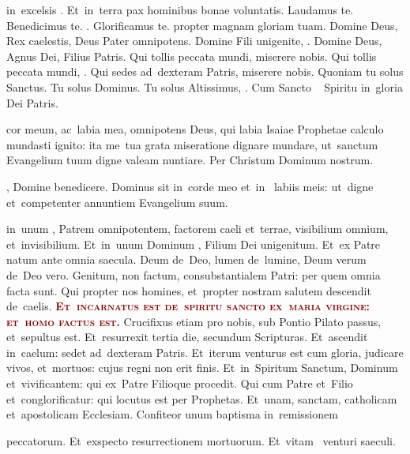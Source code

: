 \documentclass[third]{../altarcard}
\begin{document}
\begin{center}

	\begin{minipage}[t]{0.29\linewidth}

		\vspace*{2.2cm}

		 in~excelsis . Et~in~terra pax
		hominibus bonae voluntatis. Laudamus te. Benedicimus te. . Glorificamus te.  propter magnam gloriam
		tuam. Domine Deus, Rex caelestis, Deus Pater omnipotens. Domine Fili
		unigenite, . Domine Deus, Agnus Dei, Filius Patris.
		Qui tollis peccata mundi, miserere nobis. Qui tollis peccata mundi,
		. Qui sedes ad~dexteram Patris,
		miserere nobis. Quoniam tu solus Sanctus. Tu solus Dominus. Tu solus
		Altissimus, . Cum Sancto \cross~ Spiritu in~gloria
		Dei Patris. \amen

		\gap

		 cor meum, ac~labia mea, omnipotens Deus, qui labia
		Isaiae Prophetae calculo mundasti ignito: ita me~tua grata miseratione
		dignare mundare, ut~sanctum Evangelium tuum digne valeam nuntiare. Per
		Christum Dominum nostrum. \amen

		\gap

		, Domine benedicere. Dominus sit in~corde meo et~in~
		labiis meis: ut~digne et~competenter annuntiem Evangelium suum. \amen

		\gap

		 in~unum , Patrem omnipotentem, factorem
		caeli et~terrae, visibilium omnium, et~invisibilium. Et~in~unum Dominum
		, Filium Dei unigenitum. Et~ex Patre natum ante
		omnia saecula. Deum de~Deo, lumen de~lumine, Deum verum de~Deo vero.
		Genitum, non factum, consubstantialem Patri: per quem omnia facta sunt.
		Qui propter nos homines, et~propter nostram salutem descendit de~caelis.
		\textcolor{Maroon}{\bfseries\scshape Et~incarnatus est de~spiritu sancto
			ex~maria virgine: et~homo factus est.} Crucifixus etiam pro nobis, sub
		Pontio Pilato passus, et~sepultus est. Et~resurrexit tertia die,
		secundum Scripturas. Et~ascendit in~caelum: sedet ad~dexteram Patris.
		Et~iterum venturus est cum gloria, judicare vivos, et~mortuos: cujus
		regni non erit finis. Et~in~Spiritum Sanctum, Dominum et~vivificantem:
		qui ex~Patre Filioque procedit. Qui cum Patre et~Filio  et~conglorificatur: qui locutus est per Prophetas. Et~unam,
		sanctam, catholicam et~apostolicam Ecclesiam. Confiteor unum baptisma
		in~remissionem
		\hspace*{2cm} \parbox{0.85\linewidth}{ \smallskip peccatorum.
			Et~exspecto resurrectionem mortuorum. Et~vitam \cross~venturi saeculi.
			\amen}


\end{minipage}
\end{center}
\end{document}
